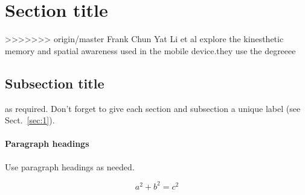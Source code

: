 \section{Section title}
>>>>>>> origin/master
\label{sec:1}
Frank Chun Yat Li et al explore the kinesthetic memory and spatial awareness used in the mobile device.they use the degreeee
\subsection{Subsection title}
\label{sec:2}
as required. Don't forget to give each section
and subsection a unique label (see Sect.~\ref{sec:1}).
\paragraph{Paragraph headings} Use paragraph headings as needed.

\begin{equation}
a^2+b^2=c^2
\end{equation}

